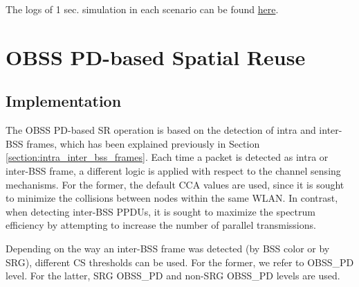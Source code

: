 \documentclass[]{article}
\begin{document}
	The logs of 1 sec. simulation in each scenario can be found \href{https://bitbucket.org/fwilhelmi/towards_centralized_spatial_reuse/src/master/IEEE\%20802.11ax\%20SR\%20implementation/Validations/2.\%20Two\%20NAVs/}{here}.
	
	
	\section{OBSS PD-based Spatial Reuse} 
	\label{section:obss_pd_sr}
	
	\subsection{Implementation}
	
	The OBSS PD-based SR operation is based on the detection of intra and inter-BSS frames, which has been explained previously in Section \ref{section:intra_inter_bss_frames}. Each time a packet is detected as intra or inter-BSS frame, a different logic is applied with respect to the channel sensing mechanisms. For the former, the default CCA values are used, since it is sought to minimize the collisions between nodes within the same WLAN. In contrast, when detecting inter-BSS PPDUs, it is sought to maximize the spectrum efficiency by attempting to increase the number of parallel transmissions.
	
	Depending on the way an inter-BSS frame was detected (by BSS color or by SRG), different CS thresholds can be used. For the former, we refer to OBSS\_PD level. For the latter, SRG OBSS\_PD and non-SRG OBSS\_PD levels are used.
	
\end{document}
